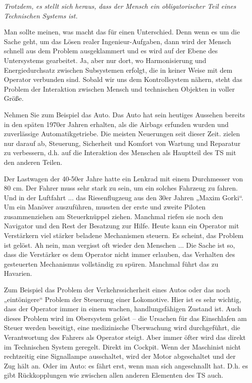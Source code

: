 \documentclass[11pt,a4paper]{article}
\begin{document}
\emph{Trotzdem, es stellt sich heraus, dass der Mensch ein obligatorischer
  Teil eines Technischen Systems ist.}

Man sollte meinen, was macht das für einen Unterschied. Denn wenn es um die
Sache geht, um das Lösen realer Ingenieur-Aufgaben, dann wird der Mensch
schnell aus dem Problem ausgeklammert und es wird auf der Ebene des
Untersystems gearbeitet. Ja, aber nur dort, wo Harmonisierung und
Energiedurchsatz zwischen Subsystemen erfolgt, die in keiner Weise mit dem
Operator verbunden sind. Sobald wir uns dem Kontrollsystem nähern, steht das
Problem der Interaktion zwischen Mensch und technischen Objekten in voller
Größe.

Nehmen Sie zum Beispiel das Auto. Das Auto hat sein heutiges Aussehen bereits
in den späten 1970er Jahren erhalten, als die Airbags erfunden wurden und
zuverlässige Automatikgetriebe. Die meisten Neuerungen seit dieser Zeit.
zielen nur darauf ab, Steuerung, Sicherheit und Komfort von Wartung und
Reparatur zu verbessern, d.h. auf die Interaktion des Menschen als Hauptteil
des TS mit den anderen Teilen.

Der Lastwagen der 40-50er Jahre hatte ein Lenkrad mit einem Durchmesser von 80
cm.  Der Fahrer muss sehr stark zu sein, um ein solches Fahrzeug zu fahren.
Und in der Luftfahrt ...  das Riesenflugzeug aus den 30er Jahren „Maxim
Gorki“.  Um ein Manöver auszuführen, mussten der erste und zweite Piloten
zusammenziehen am Steuerknüppel ziehen. Manchmal riefen sie noch den Navigator
und den Rest der Besatzung zur Hilfe. Heute kann ein Operator mit Verstärkern
viel stärker beladene Mechanismen steuern. Es scheint, das Problem ist gelöst.
Ah nein, man vergisst oft wieder den Menschen ... Die Sache ist so, dass die
Verstärker es dem Operator nicht immer erlauben, das Verhalten des gesteuerten
Mechanismus vollständig zu spüren.  Manchmal führt das zu Havarien.

Zum Beispiel das Problem der Verkehrssicherheit eines Autos oder das noch
„eintönigere“ Problem der Steuerung einer Lokomotive. Hier ist es sehr
wichtig, dass der Operator immer in einem wachen, handlungsfähigen Zustand
ist.  Auch dieses Problem wird im Obersystem gelöst -- die Ursachen für das
Einschlafen am Steuer werden beseitigt, eine medizinische Überwachung wird
durchgeführt, die Verantwortung des Fahrers als Operator steigt. Aber immer
öfter wird das direkt im Technischen System geregelt. Direkt im Cockpit. Wenn
der Maschinist nicht rechtzeitig eine Signallampe ausschaltet, wird der Motor
abgeschaltet und der Zug hält an.  Oder im Auto: es fährt erst, wenn man sich
angeschnallt hat.  D.h. es gibt Rückkopplungen wie zwischen allen anderen
Elementen des TS auch.
\end{document}

